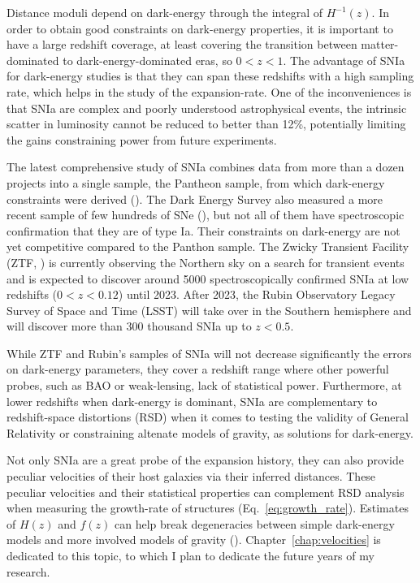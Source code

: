     Distance moduli depend on dark-energy through the integral of $H^{-1}(z)$. 
    In order to obtain good constraints on dark-energy properties, it is 
    important to have a large redshift coverage, at least covering the 
    transition between matter-dominated to dark-energy-dominated eras, so 
    $0< z< 1$. The advantage of SNIa for dark-energy studies is that they 
    can span these redshifts with a high sampling rate, which helps in 
    the study of the expansion-rate. One of the inconveniences is that SNIa 
    are complex and poorly understood astrophysical events, the intrinsic 
    scatter in luminosity cannot be reduced to better than 12\%, potentially 
    limiting the gains constraining power from future experiments. 
     
    The latest comprehensive study of SNIa combines data from more than a dozen 
    projects into a single sample, the Pantheon sample, from which dark-energy 
    constraints were derived (\cite{scolnicCompleteLightcurveSample2018}).
    The Dark Energy Survey also measured a more recent sample of few hundreds of SNe
    (\cite{broutFirstCosmologyResults2019a, broutFirstCosmologyResults2019, 
    kesslerFirstCosmologyResults2019}), 
    but not all of them have spectroscopic confirmation that they are of type Ia. 
    Their constraints on dark-energy are not yet competitive compared to the Panthon sample. 
    The Zwicky Transient Facility (ZTF, \cite{grahamZwickyTransientFacility2019}) 
    is currently observing the Northern sky 
    on a search for transient events and is expected to discover around 5000 
    spectroscopically confirmed SNIa at low redshifts ($0< z< 0.12$) until 2023. 
    After 2023, the Rubin Observatory Legacy Survey of Space and Time (LSST) 
    will take over in the Southern hemisphere
    and will discover more than 300 thousand SNIa up to $z< 0.5$. 
    
    While ZTF and Rubin's samples of SNIa will not decrease significantly the 
    errors on dark-energy parameters, they cover a redshift range where other 
    powerful probes, such as BAO or weak-lensing, lack of statistical power. 
    Furthermore, at lower redshifts when dark-energy is dominant, SNIa are 
    complementary to redshift-space distortions (RSD) when it comes to testing 
    the validity of General Relativity or constraining altenate models of gravity,
    as solutions for dark-energy. 

    Not only SNIa are a great probe of the 
    expansion history, they can also provide peculiar velocities of their 
    host galaxies via their inferred distances. 
    These peculiar velocities and their statistical properties can complement 
    RSD analysis when measuring the growth-rate of structures 
    (Eq.~\ref{eq:growth_rate}). Estimates of $H(z)$ and $f(z)$ can help 
    break degeneracies between simple dark-energy models and more involved 
    models of gravity (\cite{kimComplementarityPeculiarVelocity2020, 
    grazianiPeculiarVelocityCosmology2020}). 
    Chapter~\ref{chap:velocities} is dedicated to this 
    topic, to which I plan to dedicate the future years of my research.  



